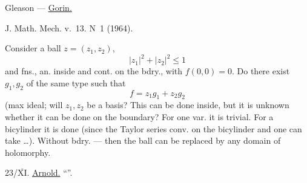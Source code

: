 Gleason — \underline{Gorin.}

\par\noindent\begin{minipage}{\linewidth}
J. Math. Mech. v.~13. N~1 (1964).
\end{minipage}\par

Consider a ball $z=(z_1,z_2)$,
\begin{equation*}
|z_1|^2+|z_2|^2\leq1
\end{equation*}
and fns., an. inside and cont. on the bdry., with $f(0,0)=0$.
Do there exist $g_1,g_2$ of the same type such that
\begin{equation*}
f=z_1g_1+z_2g_2
\end{equation*}
(max ideal; will $z_1,z_2$ be a basis?
This can be done inside, but it is unknown whether it can be done on the boundary?
For one var. it is trivial.
For a bicylinder it is done (since the Taylor series conv. on the bicylinder and one can take \ldots).
Without bdry. --- then the ball can be replaced by any domain of holomorphy.

23/\underline{$\overline{\mathrm{XI}}$}. \underline{Arnold.} “”.

